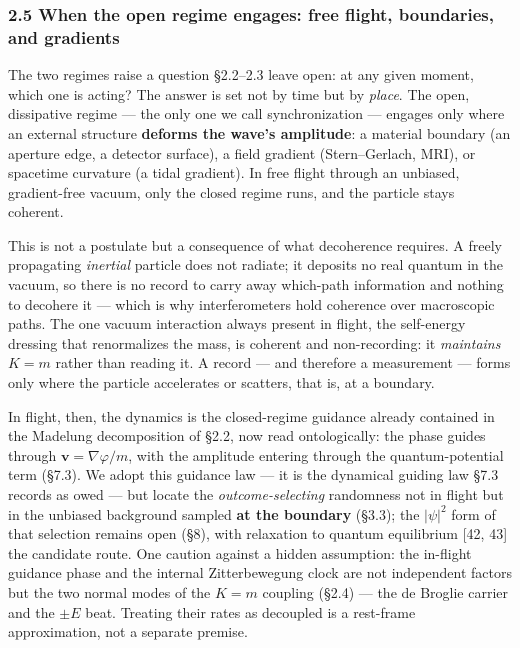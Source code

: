 \documentclass[
]{article}
\begin{document}
\subsubsection{2.5 When the open regime engages: free flight,
boundaries, and
gradients}\label{when-the-open-regime-engages-free-flight-boundaries-and-gradients}

The two regimes raise a question §2.2--2.3 leave open: at any given
moment, which one is acting? The answer is set not by time but by
\emph{place}. The open, dissipative regime --- the only one we call
synchronization --- engages only where an external structure
\textbf{deforms the wave's amplitude}: a material boundary (an aperture
edge, a detector surface), a field gradient (Stern--Gerlach, MRI), or
spacetime curvature (a tidal gradient). In free flight through an
unbiased, gradient-free vacuum, only the closed regime runs, and the
particle stays coherent.

This is not a postulate but a consequence of what decoherence requires.
A freely propagating \emph{inertial} particle does not radiate; it
deposits no real quantum in the vacuum, so there is no record to carry
away which-path information and nothing to decohere it --- which is why
interferometers hold coherence over macroscopic paths. The one vacuum
interaction always present in flight, the self-energy dressing that
renormalizes the mass, is coherent and non-recording: it
\emph{maintains} \(K=m\) rather than reading it. A record --- and
therefore a measurement --- forms only where the particle accelerates or
scatters, that is, at a boundary.

In flight, then, the dynamics is the closed-regime guidance already
contained in the Madelung decomposition of §2.2, now read ontologically:
the phase guides through \(\mathbf{v} = \nabla\varphi/m\), with the
amplitude entering through the quantum-potential term (§7.3). We adopt
this guidance law --- it is the dynamical guiding law §7.3 records as
owed --- but locate the \emph{outcome-selecting} randomness not in
flight but in the unbiased background sampled \textbf{at the boundary}
(§3.3); the \(|\psi|^2\) form of that selection remains open (§8), with
relaxation to quantum equilibrium {[}42, 43{]} the candidate route. One
caution against a hidden assumption: the in-flight guidance phase and
the internal Zitterbewegung clock are not independent factors but the
two normal modes of the \(K=m\) coupling (§2.4) --- the de Broglie
carrier and the \(\pm E\) beat. Treating their rates as decoupled is a
rest-frame approximation, not a separate premise.
\end{document}
